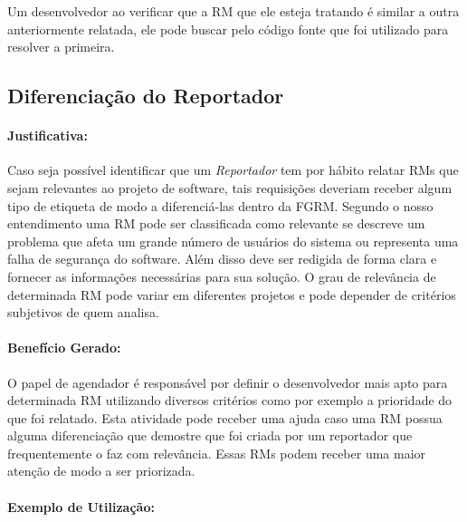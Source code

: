 Um desenvolvedor ao verificar que a RM que ele esteja tratando é similar a outra
anteriormente relatada, ele pode buscar pelo código fonte que foi utilizado para
resolver a primeira.

\subsection{Diferenciação do Reportador}
\label{sub:diferenciacao_do_reportdor}


\paragraph{Justificativa:}
\label{par:justificativa_s03}

Caso seja possível identificar que um \textit{Reportador} tem por hábito relatar
RMs que sejam relevantes ao projeto de software, tais requisições deveriam
receber algum tipo de etiqueta de modo a diferenciá-las dentro da FGRM\@.
Segundo o nosso entendimento uma RM pode ser classificada como relevante se
descreve um problema que afeta um grande número de usuários do sistema ou
representa uma falha de segurança do software. Além disso deve ser redigida de
forma clara e fornecer as informações necessárias para sua solução. O grau de
relevância de determinada RM pode variar em diferentes projetos e pode depender
de critérios subjetivos de quem analisa.

\paragraph{Benefício Gerado:}
\label{par:papéis_afetados_s03}

O papel de agendador é responsável por definir o desenvolvedor mais apto
para determinada RM utilizando diversos critérios como por exemplo a prioridade
do que foi relatado. Esta atividade pode receber uma ajuda caso uma RM possua
alguma diferenciação que demostre que foi criada por um reportador que
frequentemente o faz com relevância. Essas RMs podem receber uma maior atenção
de modo a ser priorizada.

\paragraph{Exemplo de Utilização:}
\label{par:exemplo_de_utilização_s03}

